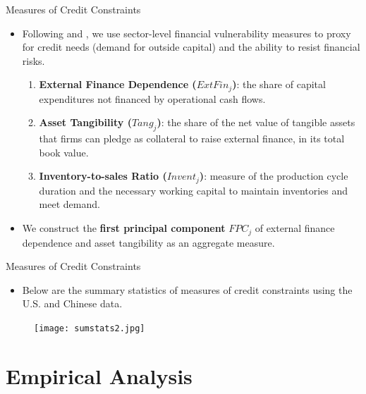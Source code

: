 \documentclass[10pt]{beamer}
\begin{document}
\begin{frame}{Measures of Credit Constraints}
	\begin{itemize}
		\item Following \cite{manova-wei-zhang2015} and \cite{fan-lai-li2015}, we use sector-level financial vulnerability measures to proxy for credit needs (demand for outside capital) and the ability to resist financial risks.
		\begin{enumerate}
			\item \textbf{External Finance Dependence ($ExtFin_j$)}: the share of capital expenditures not financed by operational cash flows.
			\item \textbf{Asset Tangibility ($Tang_j$)}: the share of the net value of tangible assets that firms can pledge as collateral to raise external finance, in its total book value.
			\item \textbf{Inventory-to-sales Ratio ($Invent_j$)}: measure of the production cycle duration and the necessary working capital to maintain inventories and meet demand. 
		\end{enumerate}
		\item We construct the \textbf{first principal component} $FPC_j$ of external finance dependence and asset tangibility as an aggregate measure.
	\end{itemize}
\end{frame}

\begin{frame}{Measures of Credit Constraints}
	\begin{itemize}
		\item Below are the summary statistics of measures of credit constraints using the U.S. and Chinese data.
	\end{itemize}
	\begin{figure}[htbp]
		\centering
		\texttt{[image: sumstats2.jpg]}
		\label{sumstats2}
	\end{figure}
\end{frame}

\section{Empirical Analysis}
\end{document}
